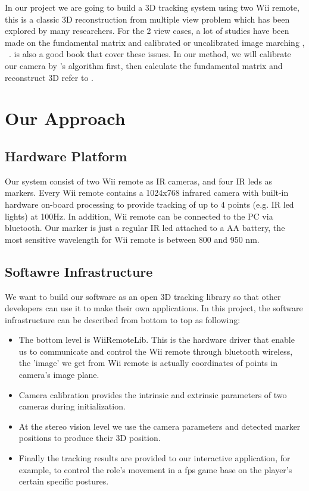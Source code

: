 \documentclass[10pt,twocolumn,letterpaper]{article}
\begin{document}
In our project we are going to build a 3D tracking system using two Wii
remote, this is a classic 3D reconstruction from multiple view problem 
which has been explored by many researchers. For the 2 view cases, 
a lot of studies have been made on the fundamental 
matrix and calibrated or uncalibrated image marching
\cite{luong95},\cite{Higgins87} \cite{Zhang95}~\cite{Hartley95}. 
\cite{Hartley03} is also a good book that cover these issues. 
In our method, we will calibrate our camera by \cite{Zhang00}'s 
algorithm first, then calculate the fundamental matrix 
and reconstruct 3D refer to \cite{Faugeras92}.

\section{Our Approach}


\subsection{Hardware Platform}
Our system consist of two Wii remote as IR cameras, and four IR leds as markers.
Every Wii remote contains a 1024x768 infrared camera 
with built-in hardware on-board processing to provide 
tracking of up to 4 points (e.g. IR led lights) at 100Hz. 
In addition, Wii remote can be connected to the PC via bluetooth. 
Our marker is just a regular IR led attached to a AA battery, 
the most sensitive wavelength for Wii remote is between 800 and 950 nm.

\subsection{Softawre Infrastructure}
We want to build our software as an open 3D tracking library so that 
other developers can use it to make their own applications. In this project, 
the software infrastructure can be described from bottom to top as following:
\begin{itemize}
\item The bottom level is WiiRemoteLib. This is the hardware driver that enable
us to communicate and control the Wii remote through bluetooth wireless, 
the 'image' we get from Wii remote is actually coordinates of points
in camera's image plane.
\item Camera calibration provides the intrinsic and extrinsic parameters 
of two cameras during initialization.
\item At the stereo vision level we use the camera parameters and detected marker positions
to produce their 3D position.
\item Finally the tracking results are provided to our interactive application, 
for example, to control the role's movement in a fps game base on 
the player's certain specific postures.
\end{itemize}
\end{document}
